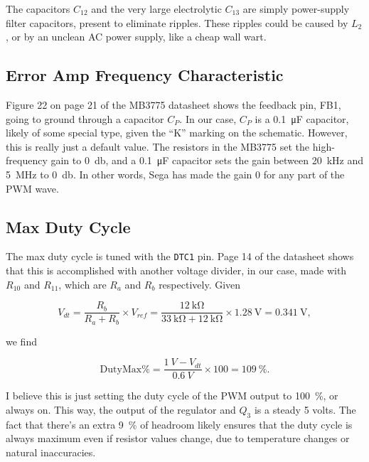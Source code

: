 \documentclass{article}
\newcommand{\chippin}{\texttt}
\begin{document}
The capacitors $C_{12}$ and the very large electrolytic $C_{13}$ are
simply power-supply filter capacitors, present to eliminate
ripples. These ripples could be caused by $L_2$, or by an unclean
AC power supply, like a cheap wall wart.


\subsection{Error Amp Frequency Characteristic}
Figure 22 on page 21 of the MB3775 datasheet shows the feedback pin,
FB1, going to ground through a capacitor $C_P$. In our case, $C_P$ is
a \qty{0.1}{\micro\farad} capacitor, likely of some special type,
given the ``K'' marking on the schematic. However, this is really just
a default value. The resistors in the MB3775 set the high-frequency
gain to \qty{0}{\decibel}, and a \qty{0.1}{\micro\farad} capacitor
sets the gain between \qty{20}{\kilo\hertz} and \qty{5}{\mega\hertz}
to \qty{0}{\decibel}. In other words, Sega has made the gain 0 for any
part of the PWM wave.

\subsection{Max Duty Cycle}
The max duty cycle is tuned with the \chippin{DTC1} pin. Page 14 of
the datasheet shows that this is accomplished with another voltage
divider, in our case, made with $R_{10}$ and $R_{11}$, which are $R_a$
and $R_b$ respectively. Given

\begin{displaymath}
  V_{dt} = \frac{R_b}{R_a+R_b} \times{} V_{ref} =
  \frac{\qty{12}{\kilo\ohm}}{\qty{33}{\kilo\ohm} + \qty{12}{\kilo\ohm}} \times{}
  \qty{1.28}{\volt} = \qty{0.341}{\volt},
\end{displaymath}

\noindent
we find

\begin{displaymath}
  \mathrm{Duty Max \%} = \frac{\qty{1}{V} - V_{dt}}{\qty{0.6}{V}}
  \times{} 100 = \qty{109}{\%}.
\end{displaymath}

I believe this is just setting the duty cycle of the PWM output to
\qty{100}{\%}, or always on. This way, the output of the regulator and $Q_3$
is a steady 5 volts. The fact that there's an extra \qty{9}{\%} of headroom
likely ensures that the duty cycle is always maximum even if resistor
values change, due to temperature changes or natural inaccuracies.
\end{document}
